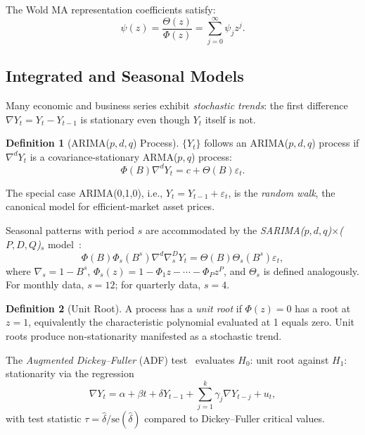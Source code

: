 \documentclass[conference]{IEEEtran}
\theoremstyle{definition}
\newtheorem{definition}{Definition}[section]
\begin{document}
The Wold MA representation coefficients satisfy:
\begin{equation}
  \psi(z) = \frac{\Theta(z)}{\Phi(z)} = \sum_{j=0}^{\infty}\psi_j z^j.
  \label{eq:wold_coeffs}
\end{equation}

\subsection{Integrated and Seasonal Models}

Many economic and business series exhibit \emph{stochastic trends}: the first
difference $\nabla Y_t = Y_t - Y_{t-1}$ is stationary even though $Y_t$ itself
is not.

\begin{definition}[ARIMA($p,d,q$) Process]
$\{Y_t\}$ follows an ARIMA($p,d,q$) process if $\nabla^d Y_t$ is a
covariance-stationary ARMA($p,q$) process:
\begin{equation}
  \Phi(B)\nabla^d Y_t = c + \Theta(B)\varepsilon_t.
  \label{eq:arima}
\end{equation}
\end{definition}

The special case ARIMA(0,1,0), i.e., $Y_t = Y_{t-1} + \varepsilon_t$, is the
\emph{random walk}, the canonical model for efficient-market asset prices.

Seasonal patterns with period $s$ are accommodated by the
\emph{SARIMA($p,d,q$)$\times$($P,D,Q$)$_s$} model~\cite{box2015time}:
\begin{equation}
  \Phi(B)\Phi_s(B^s)\nabla^d\nabla_s^D Y_t
  = \Theta(B)\Theta_s(B^s)\varepsilon_t,
  \label{eq:sarima}
\end{equation}
where $\nabla_s = 1 - B^s$, $\Phi_s(z) = 1 - \Phi_1 z - \cdots - \Phi_P z^P$,
and $\Theta_s$ is defined analogously. For monthly data, $s = 12$; for
quarterly data, $s = 4$.

\begin{definition}[Unit Root]
A process has a \emph{unit root} if $\Phi(z) = 0$ has a root at $z = 1$,
equivalently the characteristic polynomial evaluated at 1 equals zero. Unit
roots produce non-stationarity manifested as a stochastic trend.
\end{definition}

The \emph{Augmented Dickey--Fuller} (ADF) test~\cite{dickey1979distribution}
evaluates $H_0$: unit root against $H_1$: stationarity via the regression
\begin{equation}
  \nabla Y_t = \alpha + \beta t + \delta Y_{t-1}
               + \sum_{j=1}^{k}\gamma_j \nabla Y_{t-j} + u_t,
  \label{eq:adf}
\end{equation}
with test statistic $\tau = \hat{\delta}/\mathrm{se}(\hat{\delta})$ compared
to Dickey--Fuller critical values.
\end{document}
